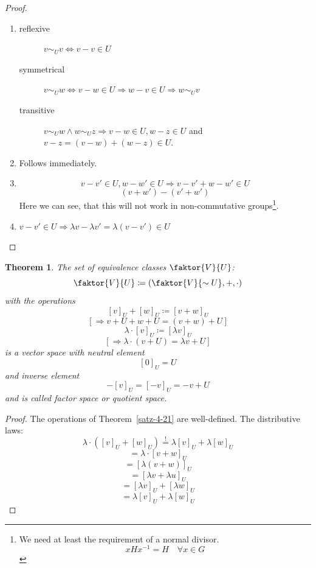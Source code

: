 \documentclass[a4paper,landscape,twocolumn]{article}
\newtheorem{theorem}{Theorem}
\begin{document}
\begin{proof}
  \begin{enumerate}
    \item
      \begin{description}
        \item[reflexive] $v \sim_U v \Leftrightarrow v-v \in U$
        \item[symmetrical] $v \sim_U w \Leftrightarrow v-w \in U \Rightarrow w-v \in U \Rightarrow w \sim_U v$
        \item[transitive] $v \sim_U w \land w \sim_U z \Rightarrow v-w \in U, w - z \in U$
          and $v - z = (v - w) + (w - z) \in U$.
      \end{description}
    \item Follows immediately.
    \item
      \[ v - v' \in U, w - w' \in U \Rightarrow v-v'+w-w' \in U \]
      \[ (v+w') - (v'+w') \]
      Here we can see, that this will not work in non-commutative groups\footnote{We need at least the requirement of a normal divisor.
      \[ xHx^{-1} = H \quad\forall x \in G \]}.
    \item $v - v' \in U \Rightarrow \lambda v - \lambda v' = \lambda(v - v') \in U$
  \end{enumerate}
\end{proof}

\begin{theorem}
  \label{satz-4-22}
  The set of equivalence classes $\faktor{V}{U}$:
  \[ \faktor{V}{U} \coloneqq \left(\faktor{V}{\sim U}, +, \cdot\right) \]
  with the operations
  \[ [v]_U + [w]_U \coloneqq [v+w]_U \]
  \[ \left[\Rightarrow v+U + w+U = (v+w)+U\right] \]
  \[ \lambda\cdot [v]_U \coloneqq [\lambda v]_U \]
  \[ \left[\Rightarrow \lambda \cdot (v + U) = \lambda v + U\right] \]
  is a vector space with neutral element
  \[ [0]_U = U \]
  and inverse element
  \[ -[v]_U = [-v]_U = -v + U \]
  and is called \emph{factor space} or \emph{quotient space}.
\end{theorem}
\begin{proof}
  The operations of Theorem~\ref{satz-4-21} are well-defined.
  The distributive laws:
  \[ \lambda \cdot ([v]_U + [w]_U) \stackrel{!}{=} \lambda [v]_U + \lambda [w]_U \]
  \[ = \lambda \cdot [v + w]_U \]
  \[ = [\lambda(v+w)]_U \]
  \[ = [\lambda v + \lambda u]_U \]
  \[ = [\lambda v]_U + [\lambda w]_U \]
  \[ = \lambda[v]_U + \lambda[w]_U \]
\end{proof}
\end{document}
